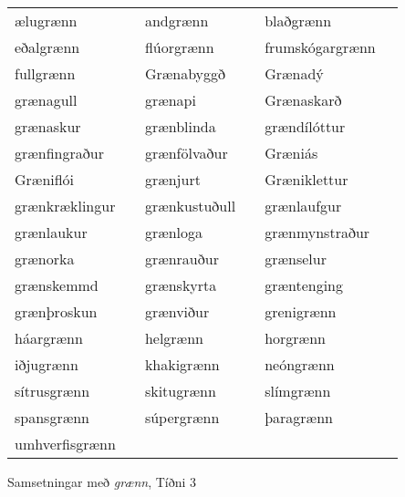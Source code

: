 \documentclass[../samsetningasafn.tex]{subfiles}
\begin{document}
\begin{wordlist}[H]
\begin{tcolorbox}

	\setlength{\extrarowheight}{3pt}
	\begin{tabular}{BlBlBl}	
		ælugrænn		&	\phantom{baa}	& 		
		andgrænn		& 	\phantom{baa}	& 		
		blaðgrænn		&	\phantom{baa}	\\ 		
		eðalgrænn		&		& 		
		flúorgrænn		&		& 		
		frumskógargrænn & 		\\ 	
		fullgrænn		&		& 		
		Grænabyggð		&		& 	
		Grænadý		&		\\ 		
		grænagull		&		& 	
		grænapi			&		& 		
		Grænaskarð		&		\\ 		
		grænaskur		&		& 		
		grænblinda		&		& 		
		grændílóttur		&		\\ 		
		grænfingraður	&		& 	
		grænfölvaður	&		& 	
		Græniás			&		\\ 		
		Græniflói		&		& 		
		grænjurt			&		& 		
		Græniklettur		&		\\ 		
		grænkræklingur	&		& 		
		grænkustuðull	&		& 	
		grænlaufgur		&		\\ 		
		grænlaukur		&		& 		
		grænloga		&		& 		
		grænmynstraður	&		\\ 	
		grænorka		&		& 	
		grænrauður		&		& 		
		grænselur		&		\\ 		
		grænskemmd	&		& 	
		grænskyrta		&		& 		
		græntenging		&		\\ 	
		grænþroskun		&		& 	
		grænviður		&		& 		
		grenigrænn		&		\\ 		
		háargrænn		&		& 		
		helgrænn		&		& 		
		horgrænn		&		\\ 		
		iðjugrænn		&		& 		
		khakigrænn		&		& 		
		neóngrænn		&		\\ 		
		sítrusgrænn		&		& 		
		skitugrænn		&		& 		
		slímgrænn		&		\\ 		
		spansgrænn		&		& 		
		súpergrænn		&		& 		
		þaragrænn		&		\\ 		
		umhverfisgrænn	&		& 	
						&		&
						&
	\end{tabular}

\end{tcolorbox}
	\caption{Samsetningar með \textit{grænn}, Tíðni 3}
	\label{listi:graent.3}
\end{wordlist}
\end{document}
